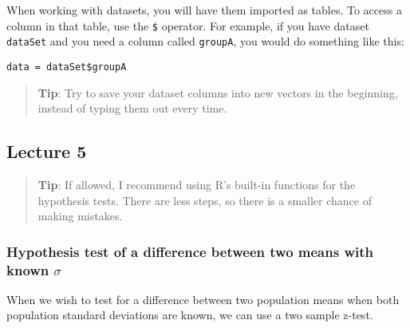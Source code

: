 When working with datasets, you will have them imported as tables. To
access a column in that table, use the \texttt{\$} operator. For
example, if you have dataset \texttt{dataSet} and you need a column
called \texttt{groupA}, you would do something like this:

\texttt{data\ =\ dataSet\$groupA}

\begin{quote}
\textbf{Tip}: Try to save your dataset columns into new vectors in the
beginning, instead of typing them out every time.
\end{quote}

\hypertarget{lecture-5}{%
\subsection{Lecture 5}\label{lecture-5}}

\begin{quote}
\textbf{Tip}: If allowed, I recommend using R's built-in functions for
the hypothesis tests. There are less steps, so there is a smaller chance
of making mistakes.
\end{quote}

\hypertarget{hypothesis-test-of-a-difference-between-two-means-with-known-sigma}{%
\subsubsection{\texorpdfstring{Hypothesis test of a difference between
two means with known
\(\sigma\)}{Hypothesis test of a difference between two means with known \textbackslash sigma}}\label{hypothesis-test-of-a-difference-between-two-means-with-known-sigma}}

When we wish to test for a difference between two population means when
both population standard deviations are known, we can use a two sample
z-test.

